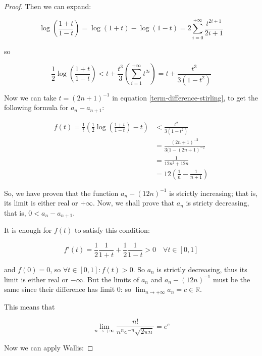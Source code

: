 \documentclass[12pt,a4paper]{report}
\numberwithin{equation}{section}
\theoremstyle{definition}
\theoremstyle{remark}
\begin{document}
\begin{proof}
Then we can expand:

\begin{equation}
\log\left(
\frac{1+t}{1-t}\right)
 = \log (1+t) -\log (1-t) = 2\sum_{i=0}^{+\infty} \frac{t^{2i+1}}{2i+1}
\end{equation}

so

\begin{equation}
\frac 12 \log \left( \frac{1+t}{1-t} \right) <
t + \frac{t^3}{3} \left(
\sum_{i=1}^{+\infty} t^{2i}
\right) = t + \frac{t^3}{3 (1-t^2)}
\end{equation}

Now we can take $t = (2n+1)^{-1}$ in equation \eqref{term-difference-stirling}, to get the following formula for $a_n - a_{n+1}$:

\begin{align}
f(t) = \frac 1t \left(
\frac 12 \log \left(\frac{1+t}{1-t}\right) -t
\right) &<
\frac{t^2}{3(1-t^2)} \\
&=
\frac{(2n+1)^{-2}}{3(1-(2n+1)^{-2}} \\ 
&= \frac 1{12n^2 + 12n} \\ 
&= 12 \left(\frac 1n - \frac{1}{n+1}\right)
\end{align}

So, we have proven that the function $a_n - (12 n) ^{-1}$ is strictly increasing; that is, its limit is either real or $+\infty$. Now, we shall prove that $a_n$ is stricty decreasing, that is, $0<a_n - a_{n+1}$.

It is enough for $f(t)$ to satisfy this condition:

\begin{equation}
f'(t) =\frac 12 \frac{1}{1+t} + \frac{1}{2} \frac{1}{1-t} > 0 \quad \forall t \in [0, 1]
\end{equation}

and $f(0) = 0$, so $\forall t \in [0, 1]: f(t)>0$. So $a_n$ is strictly decreasing, thus its limit is either real or $-\infty$. But the limits of $a_n$ and $a_n - (12n)^{-1}$ must be the same since their difference has limit 0: so $\lim_{n\rightarrow +\infty} a_n = c \in \mathbb{R}$.

This means that

\begin{equation}
\lim_{n\rightarrow +\infty} \frac{n!}{n^n e^{-n} \sqrt{2\pi n}} = e^c
\end{equation}

Now we can apply Wallis:


\end{proof}
\end{document}
